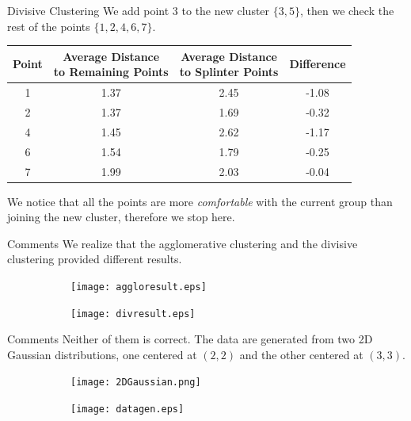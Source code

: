 \documentclass{beamer}
\begin{document}
	\begin{frame}{Divisive Clustering}
		We add point 3 to the new cluster $\{3, 5\}$, then we check the rest of the points $\{1,2,4,6,7\}$.
		\begin{table}[htbp]
			\begin{tabular}{cccc}
				\toprule
				Point & \makecell{Average Distance \\ to Remaining Points} & \makecell{Average Distance \\ to Splinter Points} & Difference\\
				\midrule
				1& 1.37 & 2.45 & -1.08\\
				2& 1.37 & 1.69 & -0.32\\
				4& 1.45& 2.62 & -1.17\\
				6& 1.54 & 1.79 & -0.25\\
				7& 1.99&  2.03 & -0.04\\
				\bottomrule
			\end{tabular}
		\end{table}
		We notice that all the points are more \emph{comfortable} with the current group than joining the new cluster, therefore we stop here.
	\end{frame}
	
	\begin{frame}{Comments}
		We realize that the agglomerative clustering and the divisive clustering provided different results.
		\begin{figure}[htbp]
			\begin{subfigure}[b]{0.45\columnwidth}
				\centering
				\texttt{[image: aggloresult.eps]}
			\end{subfigure}
			\hfill
			\begin{subfigure}[b]{0.45\columnwidth}
				\centering
				\texttt{[image: divresult.eps]}
			\end{subfigure}
		\end{figure}
	\end{frame}
	
	\begin{frame}{Comments}
		Neither of them is correct. The data are generated from two 2D Gaussian distributions, one centered at $(2,2)$ and the other centered at $(3,3)$.
		\begin{figure}[htbp]
			\begin{subfigure}{0.45\columnwidth}
				\centering
				\texttt{[image: 2DGaussian.png]}
			\end{subfigure}
			\hfill
			\begin{subfigure}{0.45\columnwidth}
				\centering
				\texttt{[image: datagen.eps]}
			\end{subfigure}
		\end{figure}
	\end{frame}
	
\end{document}
